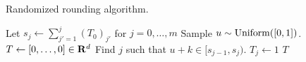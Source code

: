 \begin{algorithm}[h!]
\caption{Randomized rounding algorithm.}
\label{alg:round}
\begin{algorithmic}[1]
\State Let $s_j \gets \sum_{j'=1}^j (T_0)_{j'}$ for $j = 0,\ldots,m$ 
\State Sample $u \sim \operatorname{Uniform}([0,1])$.
\State $T \gets [0,\ldots,0] \in \mathbf{R}^d$
\State Find $j$ such that $u+k \in [s_{j-1},s_j)$. 
\State $T_j \gets 1$
\EndFor
\State \Return $T$
\EndProcedure
\end{algorithmic}
\end{algorithm}
